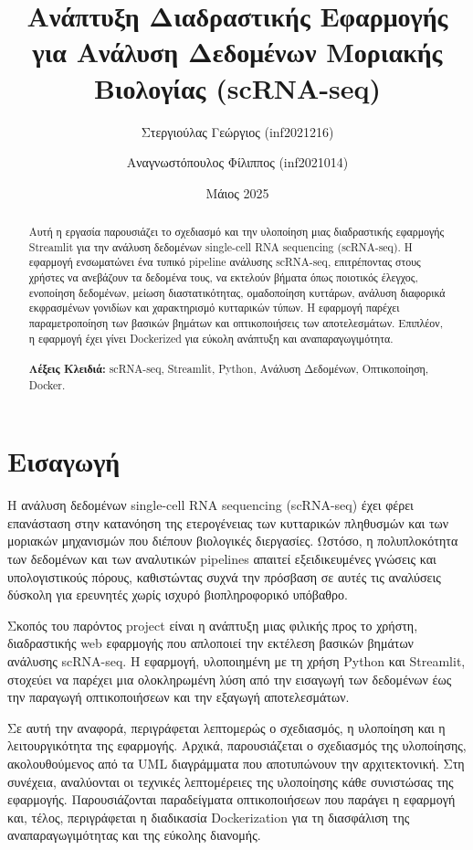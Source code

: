 \documentclass[12pt, a4paper]{article}
\title{Ανάπτυξη Διαδραστικής Εφαρμογής για Ανάλυση Δεδομένων Μοριακής Βιολογίας (scRNA-seq)}
\author{Στεργιούλας Γεώργιος (inf2021216) \and Αναγνωστόπουλος Φίλιππος (inf2021014)} %
\date{Μάιος 2025}
\begin{document}
\maketitle 

\begin{abstract}
\noindent 
Αυτή η εργασία παρουσιάζει το σχεδιασμό και την υλοποίηση μιας διαδραστικής εφαρμογής Streamlit για την ανάλυση δεδομένων single-cell RNA sequencing (scRNA-seq). 
Η εφαρμογή ενσωματώνει ένα τυπικό pipeline ανάλυσης scRNA-seq, επιτρέποντας στους χρήστες να ανεβάζουν τα δεδομένα τους, να εκτελούν βήματα όπως ποιοτικός έλεγχος, ενοποίηση δεδομένων, μείωση διαστατικότητας, ομαδοποίηση κυττάρων, ανάλυση διαφορικά εκφρασμένων γονιδίων και χαρακτηρισμό κυτταρικών τύπων. 
Η εφαρμογή παρέχει παραμετροποίηση των βασικών βημάτων και οπτικοποιήσεις των αποτελεσμάτων. Επιπλέον, η εφαρμογή έχει γίνει Dockerized για εύκολη ανάπτυξη και αναπαραγωγιμότητα.
\\ \\ 
\textbf{Λέξεις Κλειδιά:} scRNA-seq, Streamlit, Python, Ανάλυση Δεδομένων, Οπτικοποίηση, Docker.
\end{abstract}

\tableofcontents 
\newpage

\section{Εισαγωγή}
\label{sec:eisagogi}
Η ανάλυση δεδομένων single-cell RNA sequencing (scRNA-seq) έχει φέρει επανάσταση στην κατανόηση της ετερογένειας των κυτταρικών πληθυσμών και των μοριακών μηχανισμών που διέπουν βιολογικές διεργασίες. 
Ωστόσο, η πολυπλοκότητα των δεδομένων και των αναλυτικών pipelines απαιτεί εξειδικευμένες γνώσεις και υπολογιστικούς πόρους, καθιστώντας συχνά την πρόσβαση σε αυτές τις αναλύσεις δύσκολη για ερευνητές χωρίς ισχυρό βιοπληροφορικό υπόβαθρο.

Σκοπός του παρόντος project είναι η ανάπτυξη μιας φιλικής προς το χρήστη, διαδραστικής web εφαρμογής που απλοποιεί την εκτέλεση βασικών βημάτων ανάλυσης scRNA-seq. 
Η εφαρμογή, υλοποιημένη με τη χρήση Python και Streamlit, στοχεύει να παρέχει μια ολοκληρωμένη λύση από την εισαγωγή των δεδομένων έως την παραγωγή οπτικοποιήσεων και την εξαγωγή αποτελεσμάτων.

Σε αυτή την αναφορά, περιγράφεται λεπτομερώς ο σχεδιασμός, η υλοποίηση και η λειτουργικότητα της εφαρμογής. 
Αρχικά, παρουσιάζεται ο σχεδιασμός της υλοποίησης, ακολουθούμενος από τα UML διαγράμματα που αποτυπώνουν την αρχιτεκτονική. 
Στη συνέχεια, αναλύονται οι τεχνικές λεπτομέρειες της υλοποίησης κάθε συνιστώσας της εφαρμογής. 
Παρουσιάζονται παραδείγματα οπτικοποιήσεων που παράγει η εφαρμογή και, τέλος, περιγράφεται η διαδικασία Dockerization για τη διασφάλιση της αναπαραγωγιμότητας και της εύκολης διανομής.
\end{document}
